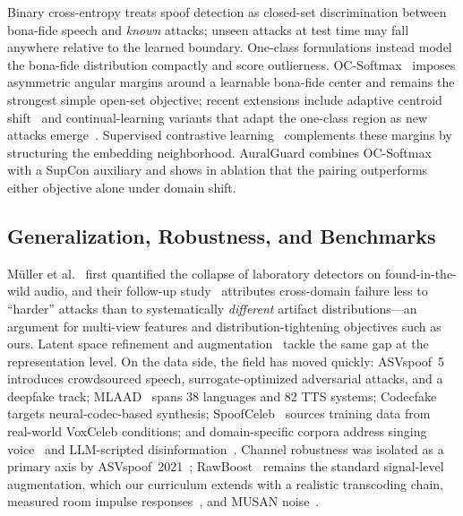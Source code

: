 Binary cross-entropy treats spoof detection as closed-set discrimination between
bona-fide speech and \emph{known} attacks; unseen attacks at test time may fall
anywhere relative to the learned boundary. One-class formulations instead model the
bona-fide distribution compactly and score outlierness.
OC-Softmax~\cite{zhang2021oneclass} imposes asymmetric angular margins around a
learnable bona-fide center and remains the strongest simple open-set objective; recent
extensions include adaptive centroid shift~\cite{kim2024oneclassknowledge} and
continual-learning variants that adapt the one-class region as new attacks
emerge~\cite{zhang2024remember}. Supervised contrastive learning~\cite{khosla2020supcon}
complements these margins by structuring the embedding neighborhood. AuralGuard
combines OC-Softmax with a SupCon auxiliary and shows in ablation that the pairing
outperforms either objective alone under domain shift.

\subsection{Generalization, Robustness, and Benchmarks}
\label{ssec:related-gen}

M{\"u}ller et al.~\cite{muller2022inthewild} first quantified the collapse of
laboratory detectors on found-in-the-wild audio, and their follow-up
study~\cite{muller2024harder} attributes cross-domain failure less to ``harder''
attacks than to systematically \emph{different} artifact distributions---an argument
for multi-view features and distribution-tightening objectives such as ours. Latent
space refinement and augmentation~\cite{wang2025latentrefine} tackle the same gap at
the representation level. On the data side, the field has moved quickly:
ASVspoof~5~\cite{wang2024asvspoof5,wang2025asvspoof5journal} introduces crowdsourced
speech, surrogate-optimized adversarial attacks, and a deepfake track;
MLAAD~\cite{muller2024mlaad} spans 38 languages and 82 TTS systems;
Codecfake~\cite{xie2025codecfake} targets neural-codec-based synthesis;
SpoofCeleb~\cite{jung2025spoofceleb} sources training data from real-world VoxCeleb
conditions; and domain-specific corpora address singing voice~\cite{zang2024singfake}
and LLM-scripted disinformation~\cite{luong2024llamapartialspoof}. Channel robustness
was isolated as a primary axis by ASVspoof~2021~\cite{liu2023asvspoof2021};
RawBoost~\cite{tak2022rawboost} remains the standard signal-level augmentation, which
our curriculum extends with a realistic transcoding chain, measured room impulse
responses~\cite{ko2017rir}, and MUSAN noise~\cite{snyder2015musan}.

